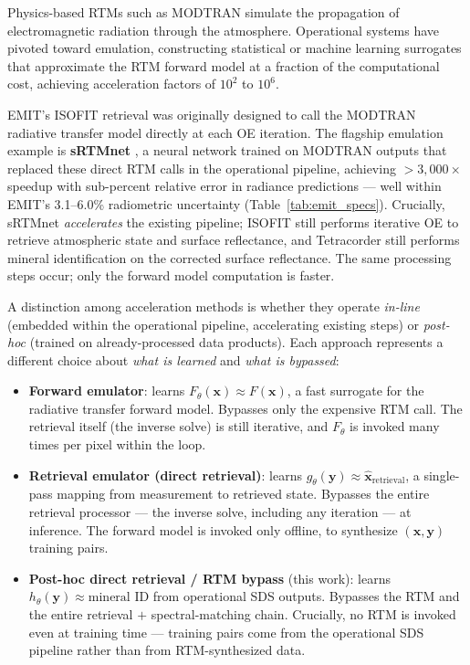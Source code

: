 \documentclass[preprint,12pt]{elsarticle}
\begin{document}
Physics-based RTMs such as MODTRAN simulate the propagation of electromagnetic radiation through the atmosphere. 
Operational systems have pivoted toward emulation, constructing statistical or machine learning surrogates that approximate the RTM forward model at a fraction of the computational cost, achieving acceleration factors of $10^2$ to $10^6$.

EMIT's ISOFIT retrieval was originally designed to call the MODTRAN radiative transfer model directly at each OE iteration. 
The flagship emulation example is \textbf{sRTMnet} \cite{brodrick2021, emit_l2a_atbd}, a neural network trained on MODTRAN outputs that replaced these direct RTM calls in the operational pipeline, achieving $>3{,}000\times$ speedup with sub-percent relative error in radiance predictions \cite{brodrick2021} --- well within EMIT's 3.1--6.0\% radiometric uncertainty (Table~\ref{tab:emit_specs}). 
Crucially, sRTMnet \emph{accelerates} the existing pipeline; 
ISOFIT still performs iterative OE to retrieve atmospheric state and surface reflectance, and Tetracorder still performs mineral identification on the corrected surface reflectance. 
The same processing steps occur; only the forward model computation is faster.

A distinction among acceleration methods is whether they operate \emph{in-line} (embedded within the operational pipeline, accelerating existing steps) or \emph{post-hoc} (trained on already-processed data products). Each approach represents a different choice about \emph{what is learned} and \emph{what is bypassed}:
\begin{itemize}
  \item \textbf{Forward emulator}: learns $F_{\theta}(\mathbf{x}) \approx F(\mathbf{x})$, a fast surrogate for the radiative transfer forward model. Bypasses only the expensive RTM call. The retrieval itself (the inverse solve) is still iterative, and $F_{\theta}$ is invoked many times per pixel within the loop.
  \item \textbf{Retrieval emulator (direct retrieval)}: learns $g_{\theta}(\mathbf{y}) \approx \hat{\mathbf{x}}_{\text{retrieval}}$, a single-pass mapping from measurement to retrieved state. Bypasses the entire retrieval processor --- the inverse solve, including any iteration --- at inference. The forward model is invoked only offline, to synthesize $(\mathbf{x}, \mathbf{y})$ training pairs.
  \item \textbf{Post-hoc direct retrieval / RTM bypass} (this work): learns $h_{\theta}(\mathbf{y}) \approx \text{mineral~ID}$ from operational SDS outputs. Bypasses the RTM and the entire retrieval $+$ spectral-matching chain. Crucially, no RTM is invoked even at training time --- training pairs come from the operational SDS pipeline rather than from RTM-synthesized data.
\end{itemize}
\end{document}
